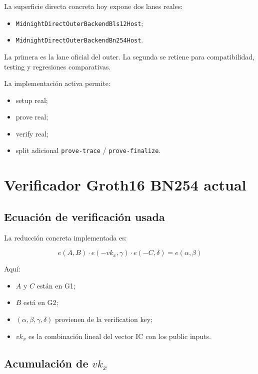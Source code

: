\documentclass[11pt,a4paper]{article}
\begin{document}
La superficie directa concreta hoy expone dos lanes reales:

\begin{itemize}
  \item \texttt{MidnightDirectOuterBackendBls12Host};
  \item \texttt{MidnightDirectOuterBackendBn254Host}.
\end{itemize}

La primera es la lane oficial del outer.
La segunda se retiene para compatibilidad, testing y regresiones comparativas.

La implementaci\'on activa permite:

\begin{itemize}
  \item setup real;
  \item prove real;
  \item verify real;
  \item split adicional \texttt{prove-trace} / \texttt{prove-finalize}.
\end{itemize}

\section{Verificador Groth16 BN254 actual}

\subsection{Ecuaci\'on de verificaci\'on usada}

La reducci\'on concreta implementada es:

\[
e(A,B) \cdot e(-vk_x,\gamma) \cdot e(-C,\delta) = e(\alpha,\beta)
\]

Aqu\'i:

\begin{itemize}
  \item \(A\) y \(C\) est\'an en G1;
  \item \(B\) est\'a en G2;
  \item \((\alpha,\beta,\gamma,\delta)\) provienen de la verification key;
  \item \(vk_x\) es la combinaci\'on lineal del vector IC con los public inputs.
\end{itemize}

\subsection{Acumulaci\'on de \texorpdfstring{$vk_x$}{vk\_x}}
\end{document}
